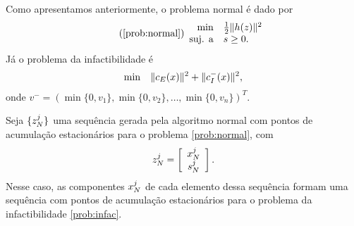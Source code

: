 Como apresentamos anteriormente, o problema normal é dado por
\begin{equation}\tag{\ref{prob:normal}}
\begin{array}{rl}
  \min & \meio\norma{h(z)}^2 \\
  \mbox{suj. a} & s \geq 0.
\end{array}
\end{equation}
Já o problema da infactibilidade é
\begin{eqnarray}
 \min & & \norma{c_E(x)}^2 + \norma{c_I^-(x)}^2, \visiblelbl{prob:infac}
\end{eqnarray}
onde $v^- = (\min\{0,v_1\}, \min\{0,v_2\}, \dots, \min\{0,v_n\})^T$.
\begin{theorem}
  Seja $\{z_N^j\}$ uma sequência gerada pela algoritmo normal com pontos de
  acumulação estacionários para o problema \eqref{prob:normal}, com
  $$z_N^j = \left[\begin{array}{c}x_N^j \\ s_N^j\end{array}\right].$$
  Nesse caso, as componentes $x_N^j$ de cada elemento dessa sequência formam uma
  sequência com pontos de acumulação estacionários para o problema da
  infactibilidade \eqref{prob:infac}.
\end{theorem}
